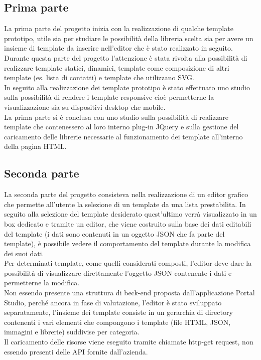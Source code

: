 \subsection{Prima parte}
La prima parte del progetto inizia con la realizzazione di qualche template prototipo, utile sia per studiare le possibilità della libreria scelta sia per avere un insieme di template da inserire nell'editor che è stato realizzato in seguito.\\
Durante questa parte del progetto l'attenzione è stata rivolta alla possibilità di realizzare template statici, dinamici, template come composizione di altri template (es. lista di contatti) e template che utilizzano SVG.\\
In seguito alla realizzazione dei template prototipo è stato effettuato uno studio sulla possibilità di rendere i template responsive cioè permetterne la visualizzazione sia su dispositivi desktop che mobile.\\
La prima parte si è conclusa con uno studio sulla possibilità di realizzare template che contenessero al loro interno plug-in JQuery e sulla gestione del caricamento delle librerie necessarie al funzionamento dei template all'interno della pagina HTML.

\subsection{Seconda parte}
La seconda parte del progetto consisteva nella realizzazione di un editor grafico che permette all'utente la selezione di un template da una lista prestabilita.
In seguito alla selezione del template desiderato quest'ultimo verrà visualizzato in un box dedicato e tramite un editor, che viene costruito sulla base dei dati editabili del template (i dati sono contenuti in un oggetto JSON che fa parte del template), è possibile vedere il comportamento del template durante la modifica dei suoi dati.	\\
Per determinati template, come quelli considerati composti, l'editor deve dare la possibilità di visualizzare direttamente l'oggetto JSON contenente i dati e permetterne la modifica.\\
Non essendo presente una struttura di beck-end proposta dall'applicazione Portal Studio, perché ancora in fase di valutazione, l'editor è stato sviluppato separatamente, l'insieme dei template consiste in un gerarchia di directory contenenti i vari elementi che compongono i template (file HTML, JSON, immagini e librerie) suddivise per categoria.\\
Il caricamento delle risorse viene eseguito tramite chiamate http-get request, non essendo presenti delle API fornite dall'azienda.

